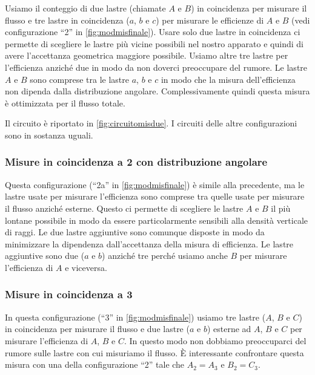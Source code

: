 Usiamo il conteggio di due lastre (chiamate $A$ e $B$) in coincidenza per misurare il flusso
 e tre lastre in coincidenza ($a$, $b$ e $c$) per misurare le efficienze di $A$ e $B$
(vedi configurazione ``2'' in \autoref{fig:modmisfinale}).
Usare solo due lastre in coincidenza ci permette di scegliere le lastre più vicine possibili nel nostro apparato
e quindi di avere l'accettanza geometrica maggiore possibile.
Usiamo altre tre lastre per l'efficienza anziché due in modo da non doverci preoccupare del rumore.
Le lastre $A$ e $B$ sono comprese tra le lastre $a$, $b$ e $c$
in modo che la misura dell'efficienza non dipenda dalla distribuzione angolare.
Complessivamente quindi questa misura è ottimizzata per il flusso totale.

Il circuito è riportato in \autoref{fig:circuitomisdue}.
I circuiti delle altre configurazioni sono in sostanza uguali.

\subsubsection{Misure in coincidenza a 2 con distribuzione angolare}

Questa configurazione (``2a'' in \autoref{fig:modmisfinale}) è simile alla precedente,
ma le lastre usate per misurare l'efficienza sono comprese tra quelle usate per misurare il flusso anziché esterne.
Questo ci permette di scegliere le lastre $A$ e $B$ il più lontane possibile
in modo da essere particolarmente sensibili alla densità verticale di raggi.
Le due lastre aggiuntive sono comunque disposte in modo da minimizzare
la dipendenza dall'accettanza della misura di efficienza.
Le lastre aggiuntive sono due ($a$ e $b$) anziché tre
perché usiamo anche $B$ per misurare l'efficienza di $A$ e viceversa.

\subsubsection{Misure in coincidenza a 3}

In questa configurazione (``3'' in \autoref{fig:modmisfinale})
usiamo tre lastre ($A$, $B$ e $C$) in coincidenza per misurare il flusso
e due lastre ($a$ e $b$) esterne ad $A$, $B$ e $C$ per misurare l'efficienza di $A$, $B$ e $C$.
In questo modo non dobbiamo preoccuparci del rumore sulle lastre con cui misuriamo il flusso.
È interessante confrontare questa misura con una della configurazione ``2'' tale che $A_2=A_3$ e $B_2=C_3$.

